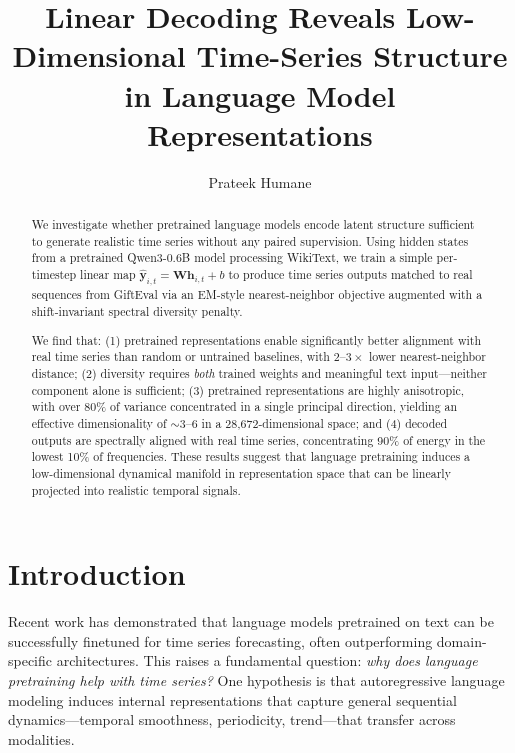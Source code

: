 \documentclass[11pt,a4paper]{article}
\title{Linear Decoding Reveals Low-Dimensional Time-Series Structure \\in Language Model Representations}
\author{Prateek Humane}
\date{}
\newcommand{\bW}{\mathbf{W}}
\newcommand{\bh}{\mathbf{h}}
\newcommand{\byhat}{\hat{\mathbf{y}}}
\begin{document}
\maketitle

\begin{abstract}
We investigate whether pretrained language models encode latent structure sufficient to generate realistic time series without any paired supervision.
Using hidden states from a pretrained Qwen3-0.6B model processing WikiText, we train a simple per-timestep linear map $\byhat_{i,t} = \bW \bh_{i,t} + b$ to produce time series outputs matched to real sequences from GiftEval via an EM-style nearest-neighbor objective augmented with a shift-invariant spectral diversity penalty.

We find that:
(1) pretrained representations enable significantly better alignment with real time series than random or untrained baselines, with $2\text{--}3\times$ lower nearest-neighbor distance;
(2) diversity requires \emph{both} trained weights and meaningful text input---neither component alone is sufficient;
(3) pretrained representations are highly anisotropic, with over 80\% of variance concentrated in a single principal direction, yielding an effective dimensionality of $\sim$3--6 in a 28{,}672-dimensional space;
and (4) decoded outputs are spectrally aligned with real time series, concentrating 90\% of energy in the lowest 10\% of frequencies.
These results suggest that language pretraining induces a low-dimensional dynamical manifold in representation space that can be linearly projected into realistic temporal signals.
\end{abstract}

\section{Introduction}

Recent work has demonstrated that language models pretrained on text can be successfully finetuned for time series forecasting, often outperforming domain-specific architectures.
This raises a fundamental question: \emph{why does language pretraining help with time series?}
One hypothesis is that autoregressive language modeling induces internal representations that capture general sequential dynamics---temporal smoothness, periodicity, trend---that transfer across modalities.
\end{document}
